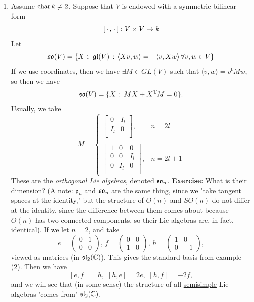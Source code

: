 \documentclass{article}
\begin{document}
\begin{enumerate}
    \item[(c)] Assume $\operatorname{char} k \neq 2$. Suppose that $V$ is endowed with a symmetric bilinear form \[ [ \, \cdot \,, \, \cdot \, ] : V \times V \to k \]
    Let \[ \mathfrak{so}(V) = \{ X \in \mathfrak{gl}(V) \, : \, \langle Xv, w \rangle = - \langle v, Xw \rangle \, \forall v,w \in V \} \]
    If we use coordinates, then we have $\exists M \in GL(V)$ such that $\langle v,w \rangle = v^{\text{t}}Mw$, so then we have \[ \mathfrak{so}(V) = \{ X \, : \, MX + X^{\text{T}}M =0 \}. \] Usually, we take \[ M = \begin{cases} 
    \begin{bmatrix}
        0 & I_{l} \\
        I_{l} & 0 \\
    \end{bmatrix}, & n=2l\\
    \\
    \begin{bmatrix}
        1 & 0 & 0\\
        0 & 0 & I_{l}\\
        0 & I_{l} & 0\\
    \end{bmatrix}, & n=2l+1
    \end{cases}
    \]
    These are the \textit{orthogonal Lie algebras}, denoted $\mathfrak{so}_{n}$.\gap
    \textbf{Exercise:} What is their dimension? \gap
    (A note: $\mathfrak{o}_{n}$ and $\mathfrak{so}_{n}$ are the same thing, since we "take tangent spaces at the identity," but the structure of $O(n)$ and $SO(n)$ do not differ at the identity, since the difference between them comes about because $O(n)$ has two connected components, so their Lie algebras are, in fact, identical).
    \remark If we let $n=2$, and take \[
    e=\begin{pmatrix} 0 & 1 \\ 0 & 0 \end{pmatrix}, \, f= \begin{pmatrix}
        0 & 0\\
        1 & 0
    \end{pmatrix}, \, h = \begin{pmatrix}
        1 & 0\\
        0 & -1
    \end{pmatrix},
    \] viewed as matrices (in $\mathfrak{sl}_{2}(\mathbb{C})$). This gives the standard basis from example (2). Then we have \[
    [e,f]=h, \, \, [h,e]=2e,\, \, [h,f]=-2f,\] and we will see that (in some sense) the structure of all \underline{semisimple} Lie algebras 'comes from' $\mathfrak{sl}_{2}(\mathbb{C})$.
\end{enumerate}
\end{document}
